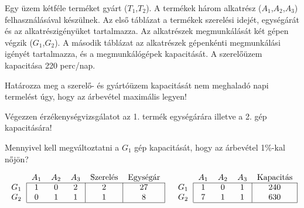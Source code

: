 \feladatszam Egy üzem kétféle terméket gyárt ($T_1$,$T_2$). A termékek három alkatrész ($A_1$,$A_2$,$A_3$) felhasználásával készülnek. Az első táblázat a termékek szerelési idejét, egységárát és az alkatrészigényüket tartalmazza. Az alkatrészek megmunkálását két gépen végzik ($G_1$,$G_2$). A második táblázat az alkatrészek gépenkénti megmunkálási igényét tartalmazza, és a megmunkálógépek kapacitását. A szerelőüzem kapacitása 220 perc/nap.
\begin{alphanumericlist}
\item Határozza meg a szerelő- és gyártóüzem kapacitását nem meghaladó napi termelést úgy, hogy az árbevétel maximális legyen!
\item Végezzen érzékenységvizsgálatot az 1. termék egységárára illetve a 2. gép kapacitására!
\item Mennyivel kell megváltoztatni a $G_1$ gép kapacitását, hogy az árbevétel 1\%-kal nőjön?
\end{alphanumericlist} 
\begin{align*}
\begin{tabular}{c|ccc|c|c|}
\multicolumn{1}{c}{}&\multicolumn{1}{c}{$A_1$}&\multicolumn{1}{c}{$A_2$}&
\multicolumn{1}{c}{$A_3$}&\multicolumn{1}{c}{Szerelés}&
\multicolumn{1}{c}{Egységár}\\\cline{2-6}
$G_1$&$1$&$0$&$2$&$2$&$27$\\
$G_2$&$0$&$1$&$1$&$1$&$8$\\\cline{2-6}
\end{tabular}&&
\begin{tabular}{c|ccc|c|}
\multicolumn{1}{c}{}&\multicolumn{1}{c}{$A_1$}&\multicolumn{1}{c}{$A_2$}&
\multicolumn{1}{c}{$A_3$}&\multicolumn{1}{c}{Kapacitás}\\\cline{2-5}
$G_1$&$1$&$0$&$1$&$240$\\
$G_2$&$7$&$1$&$1$&$630$\\\cline{2-5}
\end{tabular}
\end{align*}

